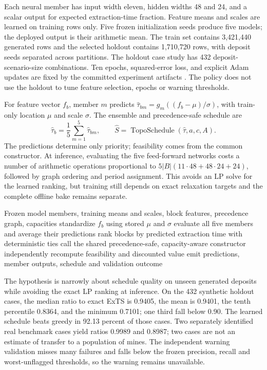 Each neural member has input width eleven, hidden widths 48 and 24, and a scalar output for expected extraction-time fraction. Feature means and scales are learned on training rows only. Five frozen initialization seeds produce five models; the deployed output is their arithmetic mean. The train set contains 3,421,440 generated rows and the selected holdout contains 1,710,720 rows, with deposit seeds separated across partitions. The holdout case study has 432 deposit-scenario-size combinations. Ten epochs, squared-error loss, and explicit Adam updates are fixed by the committed experiment artifacts \cite{kingma}. The policy does not use the holdout to tune feature selection, epochs or warning thresholds.

For feature vector $f_b$, member $m$ predicts $\hat\tau_{bm}=g_m((f_b-\mu)/\sigma)$, with train-only location $\mu$ and scale $\sigma$. The ensemble and precedence-safe schedule are
\begin{equation}
 \hat\tau_b=\frac{1}{5}\sum_{m=1}^{5}\hat\tau_{bm},\qquad
 \hat S=\operatorname{TopoSchedule}(\hat\tau,a,c,A).
\end{equation}
The predictions determine only priority; feasibility comes from the common constructor. At inference, evaluating the five feed-forward networks costs a number of arithmetic operations proportional to $5|B|(11\cdot48+48\cdot24+24)$, followed by graph ordering and period assignment. This avoids an LP solve for the learned ranking, but training still depends on exact relaxation targets and the complete offline bake remains separate.

\begin{algorithm}
\caption{Expected-time ensemble construction}
\label{alg:expected-time}
\begin{algorithmic}[1]
\Require Frozen model members, training means and scales, block features, precedence graph, capacities
  \State standardize $f_b$ using stored $\mu$ and $\sigma$
  \State evaluate all five members and average their predictions
\EndFor
\State rank blocks by predicted extraction time with deterministic ties
\State call the shared precedence-safe, capacity-aware constructor
\State independently recompute feasibility and discounted value
\State emit predictions, member outputs, schedule and validation outcome
\end{algorithmic}
\end{algorithm}

The hypothesis is narrowly about schedule quality on unseen generated deposits while avoiding the exact LP ranking at inference. On the 432 synthetic holdout cases, the median ratio to exact ExTS is 0.9405, the mean is 0.9401, the tenth percentile 0.8364, and the minimum 0.7101; one third fall below 0.90. The learned schedule beats greedy in 92.13 percent of those cases. Two separately identified real benchmark cases yield ratios 0.9989 and 0.8987; two cases are not an estimate of transfer to a population of mines. The independent warning validation misses many failures and falls below the frozen precision, recall and worst-unflagged thresholds, so the warning remains unavailable.

